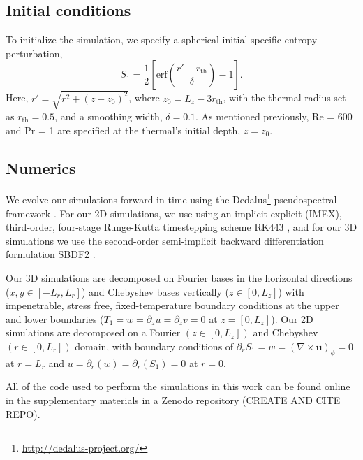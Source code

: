 \documentclass[twocolumn, amsmath, amsfonts, amssymb, trackchanges]{aastex62}
\newcommand{\grad}{\ensuremath{\nabla}}
\begin{document}
\subsection{Initial conditions}
To initialize the simulation, we specify a spherical initial specific entropy perturbation,
\begin{equation}
S_1 = \frac{1}{2}\left[\text{erf}\left(\frac{r' - r_{\text{th}}}{\delta}\right) - 1\right].
\label{eqn:thermal_IC}
\end{equation}
Here, $r' = \sqrt{r^2 + (z - z_0)^2}$, where $z_0 = L_z - 3r_{\text{th}}$, with the thermal radius set as $r_{\text{th}} = 0.5$, and a smoothing width, $\delta = 0.1$.
As mentioned previously, Re = 600 and Pr = 1 are specified at the thermal's initial depth, $z = z_0$.

\subsection{Numerics}
We evolve our simulations forward in time using the  Dedalus\footnote{\url{http://dedalus-project.org/}} pseudospectral framework \citep{burns&all2016, burns&all2019}. 
For our 2D simulations, we use using an implicit-explicit (IMEX), third-order, four-stage Runge-Kutta timestepping scheme RK443 \citep{ascher&all1997}, and for our 3D simulations we use the second-order semi-implicit backward differentiation formulation SBDF2 \citep{wang&ruuth2008}.

Our 3D simulations are decomposed on Fourier bases in the horizontal directions ($x, y \in [-L_r, L_r]$) and Chebyshev bases vertically ($z \in [0, L_z]$) with impenetrable, stress free, fixed-temperature boundary conditions at the upper and lower boundaries ($T_1 = w = \partial_z u = \partial_z v = 0$ at $z = [0, L_z]$).
Our 2D simulations are decomposed on a Fourier $(z \in [0, L_z])$ and Chebyshev $(r \in [0, L_r])$ domain, with boundary conditions of $\partial_r S_1 = w = (\grad\times\bm{u})_\phi = 0$ at $r = L_r$ and $u = \partial_r(w) = \partial_r(S_1) = 0$ at $r = 0$.

All of the code used to perform the simulations in this work can be found online in the supplementary materials in a Zenodo repository (CREATE AND CITE REPO).


\end{document}

